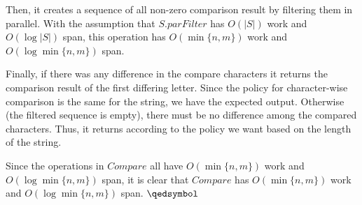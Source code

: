 Then, it creates a sequence of all non-zero comparison result by filtering them in parallel. With the assumption that $S.parFilter$ has $O(|S|)$ work and $O(\log |S|)$ span, this operation has $O(\min\{n, m\})$ work and $O(\log \min\{n, m\})$ span. 

Finally, if there was any difference in the compare characters it returns the comparison result of the first differing letter. Since the policy for character-wise comparison is the same for the string, we have the expected output. Otherwise (the filtered sequence is empty), there must be no difference among the compared characters. Thus, it returns according to the policy we want based on the length of the string. 

Since the operations in $Compare$ all have $O(\min\{n, m\})$ work and $O(\log \min\{n, m\})$ span, it is clear that $Compare$ has $O(\min\{n, m\})$ work and $O(\log \min\{n, m\})$ span. $\qedsymbol$
